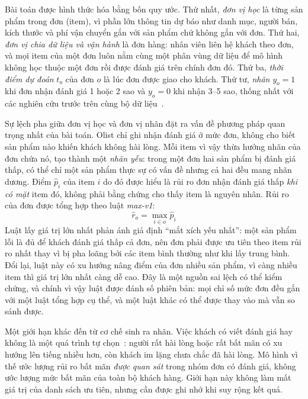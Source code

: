 \documentclass[12pt,a4paper]{report}
\begin{document}
Bài toán được hình thức hóa bằng bốn quy ước. Thứ nhất, \emph{đơn vị học} là từng sản phẩm trong đơn (item), vì phần lớn thông tin dự báo như danh mục, người bán, kích thước và phí vận chuyển gắn với sản phẩm chứ không gắn với đơn. Thứ hai, \emph{đơn vị chia dữ liệu và vận hành} là đơn hàng: nhân viên liên hệ khách theo đơn, và mọi item của một đơn luôn nằm cùng một phân vùng dữ liệu để mô hình không học thuộc một đơn rồi được đánh giá trên chính đơn đó. Thứ ba, \emph{thời điểm dự đoán} $t_o$ của đơn $o$ là lúc đơn được giao cho khách. Thứ tư, \emph{nhãn} $y_o = 1$ khi đơn nhận đánh giá 1 hoặc 2 sao và $y_o = 0$ khi nhận 3--5 sao, thống nhất với các nghiên cứu trước trên cùng bộ dữ liệu~\cite{orman2026}.

Sự lệch pha giữa đơn vị học và đơn vị nhãn đặt ra vấn đề phương pháp quan trọng nhất của bài toán. Olist chỉ ghi nhận đánh giá ở mức đơn, không cho biết sản phẩm nào khiến khách không hài lòng. Mỗi item vì vậy thừa hưởng nhãn của đơn chứa nó, tạo thành một \emph{nhãn yếu}: trong một đơn hai sản phẩm bị đánh giá thấp, có thể chỉ một sản phẩm thực sự có vấn đề nhưng cả hai đều mang nhãn dương. Điểm $\hat p_i$ của item $i$ do đó được hiểu là rủi ro đơn nhận đánh giá thấp \emph{khi có mặt} item đó, không phải bằng chứng cho thấy item là nguyên nhân. Rủi ro của đơn được tổng hợp theo luật \emph{max-v1}:
\begin{equation}\label{eq:maxv1}
  \hat{r}_o = \max_{i \in o} \hat{p}_i
\end{equation}
Luật lấy giá trị lớn nhất phản ánh giả định ``mắt xích yếu nhất'': một sản phẩm lỗi là đủ để khách đánh giá thấp cả đơn, nên đơn phải được ưu tiên theo item rủi ro nhất thay vì bị pha loãng bởi các item bình thường như khi lấy trung bình. Đổi lại, luật này có xu hướng nâng điểm của đơn nhiều sản phẩm, vì càng nhiều item thì giá trị lớn nhất càng dễ cao. Đây là một nguồn sai lệch có thể kiểm chứng, và chính vì vậy luật được đánh số phiên bản: mọi chỉ số mức đơn đều gắn với một luật tổng hợp cụ thể, và một luật khác có thể được thay vào mà vẫn so sánh được.

Một giới hạn khác đến từ cơ chế sinh ra nhãn. Việc khách có viết đánh giá hay không là một quá trình tự chọn~\cite{li2008}: người rất hài lòng hoặc rất bất mãn có xu hướng lên tiếng nhiều hơn, còn khách im lặng chưa chắc đã hài lòng. Mô hình vì thế ước lượng rủi ro bất mãn \emph{được quan sát} trong nhóm đơn có đánh giá, không ước lượng mức bất mãn của toàn bộ khách hàng. Giới hạn này không làm mất giá trị của danh sách ưu tiên, nhưng cần được ghi nhớ khi suy rộng kết quả.
\end{document}
